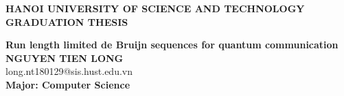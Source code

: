 \documentclass[main.tex]{subfiles}
\begin{document}
\begin{titlepage}
\thispagestyle{empty}
\begin{center}

{\textbf{\large{HANOI UNIVERSITY OF SCIENCE AND TECHNOLOGY}}}\\[4cm]

{\textbf{\huge{ GRADUATION THESIS}}}\\[1cm]
{\textbf{\Large{Run length limited de Bruijn sequences for quantum communication }}\\[1cm]

{\textbf{\large{NGUYEN TIEN LONG}}}\\
{\large{long.nt180129@sis.hust.edu.vn}}\\[0.5cm]

{\textbf{\large{Major: Computer Science} }}\\

\vspace{2cm}
\begin{table}[H]
\centering
{}
\end{table}}
\end{center}



\end{titlepage}
\end{document}
